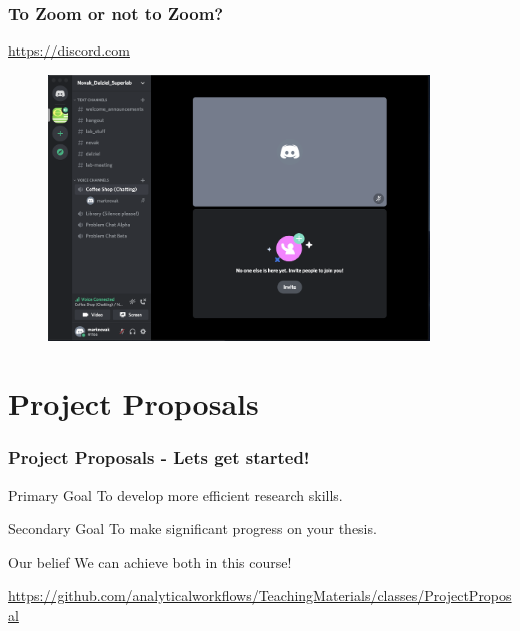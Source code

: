 \documentclass{beamer}
\begin{document}

\begin{frame}
    \frametitle{To Zoom or not to Zoom?}
   \url{https://discord.com} 
    \begin{figure}
        \centering
        \includegraphics[width = 0.9\textwidth]{figs/Discord.png}
  \end{figure}

\end{frame}


\section{Project Proposals}


\begin{frame}
    \frametitle{Project Proposals - Lets get started!}
    
    \begin{block}{Primary Goal}
        To develop more efficient research skills. 
    \end{block}
    
    \begin{block}{Secondary Goal}
        To make significant progress on your thesis.
    \end{block}
    
    \begin{block}{Our belief}
        We can achieve both in this course!
    \end{block}
    
    \url{https://github.com/analyticalworkflows/TeachingMaterials/classes/ProjectProposal}

\end{frame}
\end{document}
